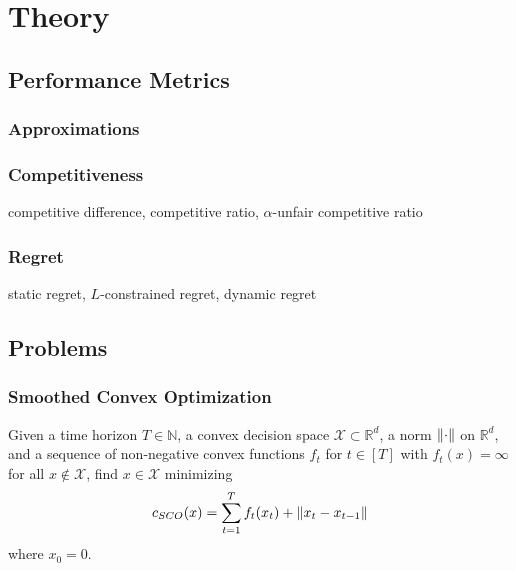
\chapter{Theory}\label{chapter:theory}

\section{Performance Metrics}
\label{section:theory:performance_metrics}

\subsection{Approximations}

\subsection{Competitiveness}

competitive difference, competitive ratio, $\alpha$-unfair competitive ratio

\subsection{Regret}

static regret, $L$-constrained regret, dynamic regret

\section{Problems}

\subsection{Smoothed Convex Optimization}

\begin{problem}
Given a time horizon $T \in \mathbb{N}$, a convex decision space $\mathcal{X} \subset \mathbb{R}^d$, a norm $\lVert\cdot\rVert$ on $\mathbb{R}^d$, and a sequence of non-negative convex functions $f_t$ for $t \in [T]$ with $f_t(x) = \infty$ for all $x \not\in \mathcal{X}$, find $x \in \mathcal{X}$ minimizing \begin{align*}
    c_{SCO}(x) = \sum_{t=1}^T f_t(x_t) + \lVert x_t - x_{t-1}\rVert
\end{align*}
where $x_0 = 0$.
\end{problem}

